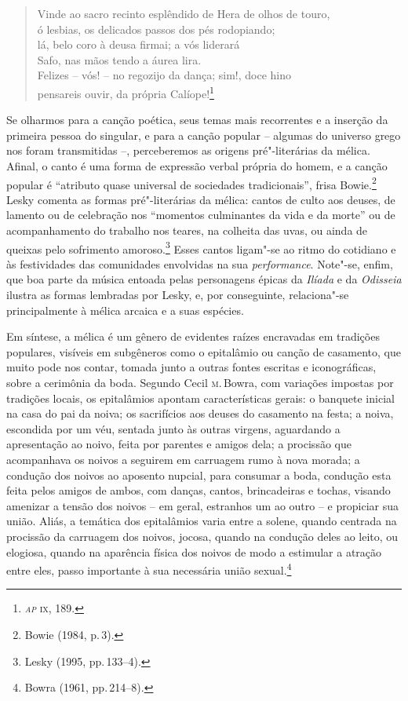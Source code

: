 \begin{verse}
\small{Vinde ao sacro recinto esplêndido de Hera de olhos de touro,\\
\hspace*{4.5em} ó lesbias, os delicados passos dos pés rodopiando;\\
lá, belo coro à deusa firmai; a vós liderará\\
\hspace*{4.5em} Safo, nas mãos tendo a áurea lira.\\
Felizes -- vós! -- no regozijo da dança; sim!, doce hino\\
\hspace*{4.5em} pensareis ouvir, da própria Calíope!}\footnote{\textit{\textsc{ap}} \textsc{ix}, 189.}
\end{verse}

Se olharmos para a canção poética, seus temas mais recorrentes e a inserção da
primeira pessoa do singular, e para a canção popular -- algumas do universo grego nos
foram transmitidas --, perceberemos as origens pré"-literárias da mélica. Afinal,
o canto é uma forma de expressão verbal própria do homem, e a canção popular é
“atributo quase universal de sociedades tradicionais”, frisa Bowie.\footnote{
Bowie (1984, p.\,3).} Lesky comenta as formas
pré"-literárias da mélica: cantos de culto aos deuses, de lamento ou de celebração
nos “momentos culminantes da vida e da morte” ou de acompanhamento do trabalho nos teares, na colheita das uvas, ou ainda de queixas pelo sofrimento amoroso.\footnote{ Lesky (1995, pp.\,133--4).} Esses cantos ligam"-se ao ritmo do
cotidiano e às festividades das comunidades envolvidas na sua
\textit{performance}. Note"-se, enfim, que boa parte da música entoada pelas
personagens épicas da \textit{Ilíada} e da \textit{Odisseia} ilustra as formas
lembradas por Lesky, e, por conseguinte, relaciona"-se principalmente à mélica
arcaica e a suas espécies.

Em síntese, a mélica é um gênero de evidentes raízes
encravadas em tradições populares, visíveis em subgêneros
como o epitalâmio ou canção de casamento, que muito pode nos contar, tomada
junto a outras fontes escritas e iconográficas, sobre a cerimônia
da boda. Segundo Cecil \textsc{m}.\,Bowra, com variações
impostas por tradições locais, os epitalâmios apontam características gerais:
o banquete inicial na casa do pai da noiva; os sacrifícios aos
deuses do casamento na festa; a noiva, escondida por um véu, sentada junto às
outras virgens, aguardando a apresentação ao noivo, feita por parentes e amigos
dela; a procissão que acompanhava os noivos a seguirem em carruagem rumo à nova
morada; a condução dos noivos ao aposento nupcial, para consumar a boda,
condução esta feita pelos amigos de ambos, com danças, cantos, brincadeiras e
tochas, visando amenizar a tensão dos noivos -- em geral, estranhos um ao outro
-- e propiciar sua união. Aliás, a temática dos epitalâmios varia entre a
solene, quando centrada na procissão da carruagem dos noivos, jocosa, quando na
condução deles ao leito, ou elogiosa, quando na aparência física dos noivos de
modo a estimular a atração entre eles, passo importante à sua necessária união
sexual.\footnote{ Bowra (1961, pp.\,214--8).}

